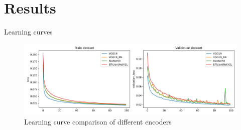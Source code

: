 \documentclass[aspectratio=169]{beamer}
\begin{document}
\section{Results}
\begin{frame}{Learning curves}
    \begin{figure}
        \centering
        \includegraphics[width=\textwidth]{./results/comparison/learning_curves.png}
        \caption*{Learning curve comparison of different encoders}
    \end{figure}
\end{frame}
\end{document}
